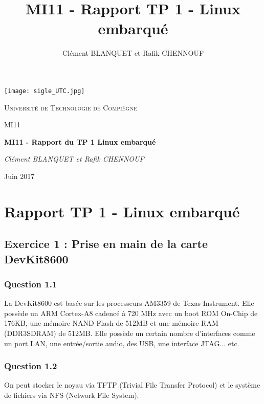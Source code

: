 \documentclass[a4paper,12pt]{report}
\author{Clément BLANQUET et Rafik CHENNOUF}
\title{MI11 - Rapport TP 1 - Linux embarqué}
\begin{document}
\begin{titlepage}

	\centering
	\texttt{[image: sigle\_UTC.jpg]}\par\vspace{1cm}
	{\scshape\LARGE Université de Technologie de Compiègne \par\vspace{1cm}}	
	{\scshape\Large MI11\par}
	\vspace{1.5cm}
	{\huge\bfseries MI11 - Rapport du TP 1 Linux embarqué\par}
	\vspace{2cm}
	{\Large\itshape Clément BLANQUET et Rafik CHENNOUF\par}
	\vspace{2cm}
	\vfill
	{\large Juin 2017}
\end{titlepage}


\renewcommand{\contentsname}{Sommaire} %
\tableofcontents
\listoffigures        %




\chapter{Rapport TP 1 - Linux embarqué}

\section{Exercice 1 : Prise en main de la carte DevKit8600}
\subsection{Question 1.1}
La DevKit8600 est basée sur les processeurs AM3359 de Texas Instrument. Elle possède un ARM Cortex-A8 cadencé à 720 MHz avec un boot ROM On-Chip de 176KB, une mémoire NAND Flash de 512MB et une mémoire RAM (DDR3SDRAM) de 512MB. Elle possède un certain nombre d'interfaces comme un port LAN, une entrée/sortie audio, des USB, une interface JTAG... etc.

\subsection{Question 1.2} 
On peut stocker le noyau via TFTP (Trivial File Transfer Protocol) et le système de fichiers via NFS (Network File System).
\end{document}

